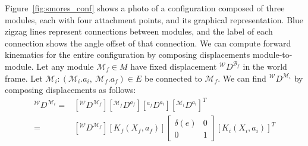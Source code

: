 \documentclass[graybox]{svmult}
\begin{document}
\begin{definition}[Configuration]

Figure~\ref{fig:smores_conf} shows a photo of a configuration composed
of three modules, each with four attachment points, and its
graphical representation. Blue zigzag lines represent connections between
modules, and the label of each connection shows the angle offset of that
connection.
We can compute forward kinematics for the entire
configuration by composing displacements module-to-module. Let any module \(\mathcal{M}_f \in M\) have
fixed displacement \({^\mathcal{W}}D^{\mathcal{B}_f}\) in the world frame.
Let \(\mathcal{M}_i: (\mathcal{M}_i.a_i,~\mathcal{M}_f.a_f) \in E \) be connected to \(\mathcal{M}_f\).
 We can find \({^\mathcal{W}}D^{\mathcal{M}_i}\) by composing displacements as follows:
\begin{align*}
{^\mathcal{W}}D^{\mathcal{M}_i} =& [{^\mathcal{W}}D^{\mathcal{M}_f}] [{^{\mathcal{M}_f}}D^{a_f}][
{^{a_f}}D^{a_i}] [{^{\mathcal{M}_i}}D^{a_i}]^T \\
=& [{^\mathcal{W}}D^{\mathcal{M}_f}] [K_f(X_f,a_f)] \begin{bmatrix} \delta(e) & 0
\\ 0 & 1\end{bmatrix} [K_i(X_i,a_i)]^T
\end{align*}


\end{definition}
\end{document}
